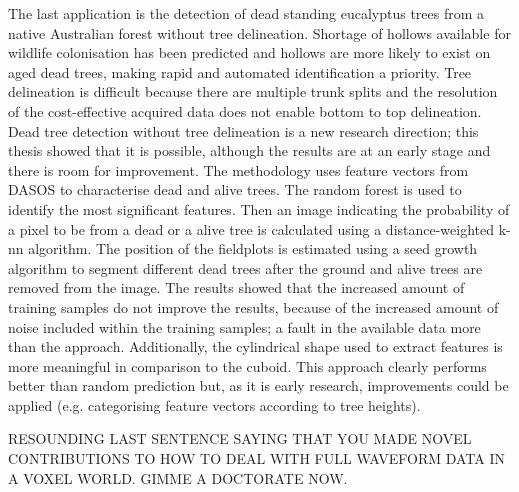 \documentclass{subfiles}
\begin{document}
\par The last application is the detection of dead standing eucalyptus trees from a native Australian forest without tree delineation. Shortage of hollows available for wildlife colonisation has been predicted and hollows are more likely to exist on aged dead trees, making rapid and automated identification a priority. Tree delineation is difficult because there are multiple trunk splits and the resolution of the cost-effective acquired data does not enable bottom to top delineation. Dead tree detection without tree delineation is a new research direction; this thesis showed that it is possible, although the results are at an early stage and there is room for improvement. The methodology uses feature vectors from DASOS to characterise dead and alive trees. The random forest is used to identify the most significant features. Then an image indicating the probability of a pixel to be from a dead or a alive tree is calculated using a distance-weighted k-nn algorithm. The position of the fieldplots is estimated using a seed growth algorithm to segment different dead trees after the ground and alive trees are removed from the image. The results showed that the increased amount of training samples do not improve the results, because of the increased amount of noise included within the training samples; a fault in the available data more than the approach.  Additionally, the cylindrical shape used to extract features is more meaningful in comparison to the cuboid. This approach clearly performs better than random prediction but, as it is early research, improvements could be applied (e.g. categorising feature vectors according to tree heights). 

RESOUNDING LAST SENTENCE SAYING THAT YOU MADE NOVEL CONTRIBUTIONS TO HOW TO DEAL WITH FULL WAVEFORM DATA IN A VOXEL WORLD.  GIMME A DOCTORATE NOW.
\end{document}
